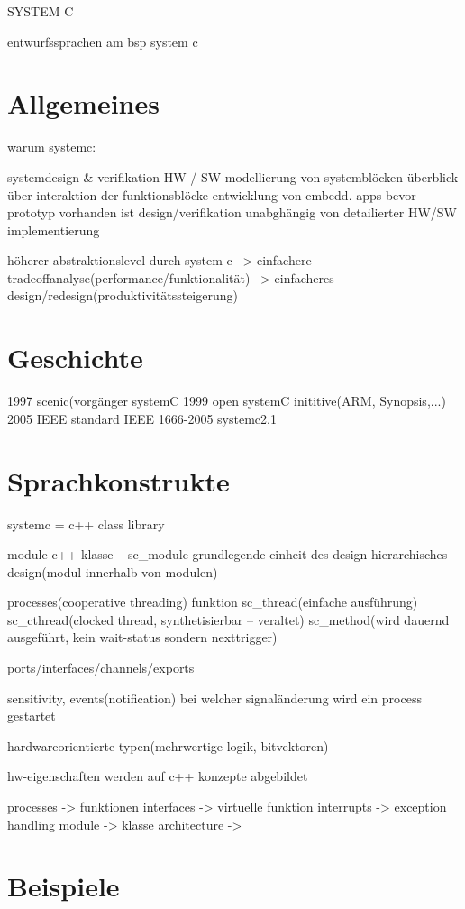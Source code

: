 
SYSTEM C

				entwurfssprachen am bsp system c

\section{Allgemeines}
	warum systemc:

	systemdesign \& verifikation HW / SW
	modellierung von systemblöcken
	überblick über interaktion der funktionsblöcke
	entwicklung von embedd. apps bevor prototyp vorhanden ist
	design/verifikation unabghängig von detailierter HW/SW implementierung

	höherer abstraktionslevel durch system c
		--> einfachere tradeoffanalyse(performance/funktionalität)
		--> einfacheres design/redesign(produktivitätssteigerung)

\section{Geschichte}
	1997 scenic(vorgänger systemC
	1999 open systemC inititive(ARM, Synopsis,...)
	2005	IEEE standard IEEE 1666-2005 systemc2.1

\section{Sprachkonstrukte}
	systemc = c++ class library
	
	module
		c++ klasse – sc\_module
		grundlegende einheit des design
		hierarchisches design(modul innerhalb von modulen)

	processes(cooperative threading)
funktion
sc\_thread(einfache ausführung)
sc\_cthread(clocked thread, synthetisierbar – veraltet)
sc\_method(wird dauernd ausgeführt, kein wait-status sondern nexttrigger)

	ports/interfaces/channels/exports

	sensitivity, events(notification)
		bei welcher signaländerung wird ein process gestartet

	hardwareorientierte typen(mehrwertige logik, bitvektoren)

	hw-eigenschaften werden auf c++ konzepte abgebildet
	
	processes -> funktionen
	interfaces -> virtuelle funktion
	interrupts -> exception handling
	module -> klasse
	architecture -> 

\section{Beispiele}

